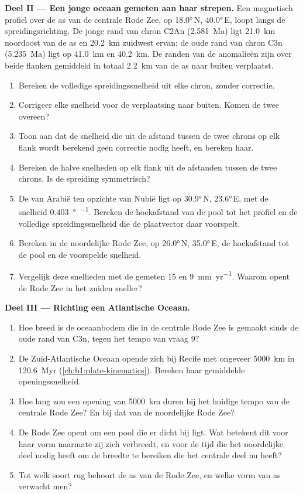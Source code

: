 \begin{problem}
\medskip
\noindent\textbf{Deel II --- Een jonge oceaan gemeten aan haar strepen.} Een magnetisch profiel over de as van de centrale Rode Zee, op \ang{18.0}\,N, \ang{40.0}\,E, loopt langs de spreidingsrichting. De jonge rand van chron C2An (\qty{2.581}{Ma}) ligt \qty{21.0}{km} noordoost van de as en \qty{20.2}{km} zuidwest ervan; de oude rand van chron C3n (\qty{5.235}{Ma}) ligt op \qty{41.0}{km} en \qty{40.2}{km}. De randen van de anomalieën zijn over beide flanken gemiddeld in totaal \qty{2.2}{km} van de as naar buiten verplaatst.
\begin{enumerate}[resume]
  \item Bereken de volledige spreidingssnelheid uit elke chron, zonder correctie.
  \item Corrigeer elke snelheid voor de verplaatsing naar buiten. Komen de twee overeen?
  \item Toon aan dat de snelheid die uit de afstand tussen de twee chrons op elk flank wordt berekend geen correctie nodig heeft, en bereken haar.
  \item Bereken de halve snelheden op elk flank uit de afstanden tussen de twee chrons. Is de spreiding symmetrisch?
  \item De  van Arabië ten opzichte van Nubië ligt op \ang{30.9}\,N, \ang{23.6}\,E, met de snelheid \qty{0.403}{\degree\per\Myr}. Bereken de hoekafstand van de pool tot het profiel en de volledige spreidingssnelheid die de plaatvector daar voorspelt.
  \item Bereken in de noordelijke Rode Zee, op \ang{26.0}\,N, \ang{35.0}\,E, de hoekafstand tot de pool en de voorspelde snelheid.
  \item Vergelijk deze snelheden met de gemeten 15 en \qty{9}{mm.yr^{-1}}. Waarom opent de Rode Zee in het zuiden sneller?
\end{enumerate}

\medskip
\noindent\textbf{Deel III --- Richting een Atlantische Oceaan.}
\begin{enumerate}[resume]
  \item Hoe breed is de oceaanbodem die in de centrale Rode Zee is gemaakt sinds de oude rand van C3n, tegen het tempo van vraag 9?
  \item De Zuid-Atlantische Oceaan opende zich bij Recife met ongeveer \qty{5000}{km} in \qty{120.6}{Myr} (\cref{ch:b1:plate-kinematics}). Bereken haar gemiddelde openingssnelheid.
  \item Hoe lang zou een opening van \qty{5000}{km} duren bij het huidige tempo van de centrale Rode Zee? En bij dat van de noordelijke Rode Zee?
  \item De Rode Zee opent om een pool die er dicht bij ligt. Wat betekent dit voor haar vorm naarmate zij zich verbreedt, en voor de tijd die het noordelijke deel nodig heeft om de breedte te bereiken die het centrale deel nu heeft?
  \item Tot welk soort rug behoort de as van de Rode Zee, en welke vorm van as verwacht men?
\end{enumerate}


\end{problem}
